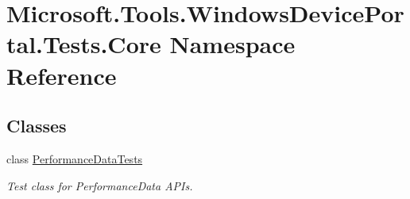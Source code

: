 \hypertarget{namespace_microsoft_1_1_tools_1_1_windows_device_portal_1_1_tests_1_1_core}{}\section{Microsoft.\+Tools.\+Windows\+Device\+Portal.\+Tests.\+Core Namespace Reference}
\label{namespace_microsoft_1_1_tools_1_1_windows_device_portal_1_1_tests_1_1_core}
\subsection*{Classes}
\begin{DoxyCompactItemize}
\item 
class \hyperlink{class_microsoft_1_1_tools_1_1_windows_device_portal_1_1_tests_1_1_core_1_1_performance_data_tests}{Performance\+Data\+Tests}
\begin{DoxyCompactList}\small\item\em Test class for Performance\+Data A\+P\+Is. \end{DoxyCompactList}\end{DoxyCompactItemize}

